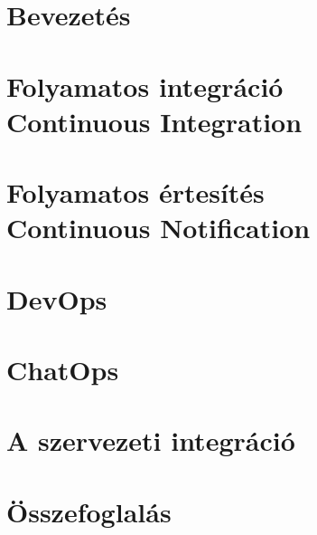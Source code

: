 \documentclass[12pt,a4paper,english,magyar,oneside]{report}
\begin{document}


\setcounter{tocdepth}{2} %
\tableofcontents %
\printnomenclature[2.5cm]

\chapter{Bevezetés}


\chapter{Folyamatos integráció\\\small Continuous Integration}
\label{chap:cont_int}


\chapter{Folyamatos értesítés\\\small Continuous Notification}
\label{chap:cont_not}


\chapter{DevOps}


\chapter{ChatOps}
\label{chapter:chatops}


\chapter{A szervezeti integráció}


\chapter{Összefoglalás}


\newpage

\printbibliography


\end{document}

